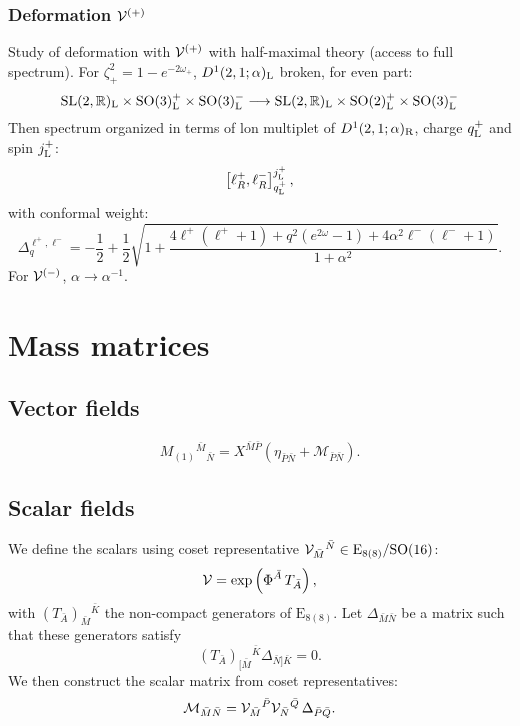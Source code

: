 \documentclass[11pt]{article}
\newcommand{\M}{\ensuremath{\mathcal{M}}\xspace}
\newcommand{\SO}{\ensuremath{\mathrm{SO}}\xspace}
\newcommand{\SL}{\ensuremath{\mathrm{SL}}\xspace}
\newcommand{\E}{\ensuremath{\mathrm{E}}\xspace}
\begin{document}
  \subsubsection{Deformation \texorpdfstring{${\cal V}^{(+)}$}{V+}}
  Study of deformation with ${\cal V}^{(+)}$ with half-maximal theory (access to full spectrum). For $\zeta^{2}_{+}=1-e^{-2\omega_{+}}$, $D^{1}(2,1;\alpha)_{\rm L}$ broken, for even part:
  \begin{equation}
    \SL(2,\mathbb{R})_{\rm L}\times\SO(3)^{+}_{\rm L}\times\SO(3)^{-}_{\rm L} \longrightarrow \SL(2,\mathbb{R})_{\rm L}\times\SO(2)^{+}_{\rm L}\times\SO(3)^{-}_{\rm L}
  \end{equation}
  Then spectrum organized in terms of lon multiplet of $D^{1}(2,1;\alpha)_{\rm R}$, charge $q_{\rm L}^{+}$ and spin $j_{\rm L}^{+}$:
  \begin{equation}
    \left[\ell^{+}_{R},\ell^{-}_{R}\right]^{j_{\rm L}^{+}}_{q_{\rm L}^{+}},
  \end{equation}
  with conformal weight:
  \begin{equation}
    \Delta_{q}^{\ell^{+},\ell^{-}} = -\frac{1}{2} + \frac{1}{2}\sqrt{1+\frac{4\ell^{+}(\ell^{+}+1)+q^{2}(e^{2\omega}-1)+4\alpha^{2}\ell^{-}(\ell^{-}+1)}{1+\alpha^{2}}}.
  \end{equation}
  For ${\cal V}^{(-)}$, $\alpha\rightarrow\alpha^{-1}$.


\section{Mass matrices}
\subsection{Vector fields}
\begin{equation}
  M_{(1)}{}^{\bar M}{}_{\bar N} = X^{\bar M\bar P}\left(\eta_{\bar P\bar N} + \M_{\bar P\bar N}\right).
\end{equation}

\subsection{Scalar fields}
We define the scalars using coset representative ${\cal V}_{\bar M}{}^{\bar N}\in\E_{8(8)}/\SO(16)$:
\begin{equation}
  {\cal V} = \exp\left(\Phi^{\bar A}\,T_{\bar A}\right),
\end{equation}
with $\left(T_{\bar A}\right)_{\bar M}{}^{\bar K}$ the non-compact generators of $\E_{8(8)}$. Let $\Delta_{\bar M\bar N}$ be a matrix such that these generators satisfy
\begin{equation}
  \left(T_{\bar A}\right)_{[\bar M}{}^{\bar K}\Delta_{\bar N]\bar K} = 0.
\end{equation}
We then construct the scalar matrix from coset representatives:
\begin{equation}
  \M_{\bar M\bar N} = {\cal V}_{\bar M}{}^{\bar P}{\cal V}_{\bar N}{}^{\bar Q}\,\Delta_{\bar P\bar Q}.
\end{equation}
\end{document}
